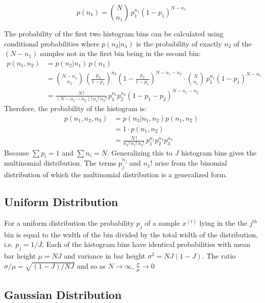 \documentclass[12pt]{article}
\begin{document}
\begin{equation}
	p(n_1) = \binom {N} {n_1} \, p_1^{n_1} (1-p_1)^{N - n_1}
\end{equation}

The probability of the first two histogram bins can be calculated using conditional probabilities where $p(n_2|n_1)$ is the probability of exactly $n_2$ of the $(N-n_1)$ samples not in the first bin being in the second bin:
\begin{align}
	p(n_1, n_2) &= p(n_2 | n_1) \, p(n_1) \nonumber \\
    			&= \binom {N {-} n_1}{n_2} \, 
                	\left( \frac {p_2} {1 - p_1} \right)^{n_2} 
                	\left( 1 - \frac {p_2} {1-p_1} \right) ^ {N - n_1 - n_2} 
                	\cdot \binom {N}{n_1} \, p_1^{n_1} (1-p_1)^{N - n_1} \nonumber \\
                &= \frac {N\,!} {(N - n_1 - n_2)!\, n_1!\, n_2!} \,
                	p_1^{n_1} p_2^{n_2} (1 - p_1 - p_2)^{N - n_1 - n_2}
\end{align}
Therefore, the probability of the histogram is:
\begin{align}
	p(n_1, n_2, n_3) &= p(n_3 | n_1, n_2) p(n_1, n_2) \nonumber \\
                     &= 1 \cdot p(n_1, n_2) \nonumber \\
                     &= \frac {N\,!} {n_3!\, n_1!\, n_2!} \, p_1^{n_1} p_2^{n_2} p_3^{n_3}
\end{align}
Because $\sum p_i = 1$ and $\sum n_i = N$. Generalizing this to $J$ histogram bins gives the multinomial distribution. The terms $p_j^{n_j}$ and $n_1!$ arise from the binomial distribution of which the multinomial distribution is a generalized form. 

\subsection{Uniform Distribution}

For a uniform distribution the probability $p_j$ of a sample  $x^{(i)}$ lying in the the $j^{th}$ bin is equal to the width of the bin divided by the total width of the distribution, i.e.  $p_j = 1/J$. Each of the histogram bins have identical probabilities with mean bar height  $\mu = NJ$ and variance in bar height $\sigma^2 = NJ(1-J)$. The ratio $\sigma / \mu = \sqrt {(1-J) / NJ}$ and so as $N \to \infty$, $\frac \sigma \mu \to 0$

\subsection{Gaussian Distribution}
\end{document}
